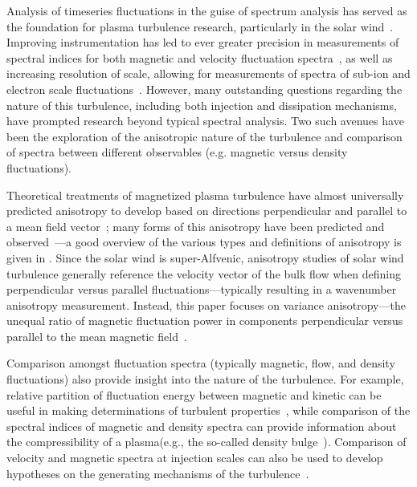 \documentclass[manuscript]{aastex}
\begin{document}
Analysis of timeseries fluctuations in the guise of spectrum analysis has served as the foundation for plasma turbulence research, particularly in the solar wind~\citep{gol95,tum95}. Improving instrumentation has led to ever greater precision in measurements of spectral indices for both magnetic and velocity fluctuation spectra~\citep{pod07}, as well as increasing resolution of scale, allowing for measurements of spectra of sub-ion and electron scale fluctuations~\citep{yor08,ale09,sah09,che13}. However, many outstanding questions regarding the nature of this turbulence, including both injection and dissipation mechanisms, have prompted research beyond typical spectral analysis. Two such avenues have been the exploration of the anisotropic nature of the turbulence and comparison of spectra between different observables (e.g. magnetic versus density fluctuations).

Theoretical treatments of magnetized plasma turbulence have almost universally predicted anisotropy to develop based on directions perpendicular and parallel to a mean field vector~\citep{mon81,mat90,sri95,zho04,bol06}; many forms of this anisotropy have been predicted and observed~\citep{das05,hor08,pod09,per09,wic10,he11}---a good overview of the various types and definitions of anisotropy is given in \citet{hor12}. Since the solar wind is super-Alfvenic, anisotropy studies of solar wind turbulence generally reference the velocity vector of the bulk flow when defining perpendicular versus parallel fluctuations---typically resulting in a wavenumber anisotropy measurement. Instead, this paper focuses on variance anisotropy---the unequal ratio of magnetic fluctuation power in components perpendicular versus parallel to the mean magnetic field~\citep{bel71,smi06}.

Comparison amongst fluctuation spectra (typically magnetic, flow, and density fluctuations) also provide insight into the nature of the turbulence. For example, relative partition of fluctuation energy between magnetic and kinetic can be useful in making determinations of turbulent properties~\citep{pod07}, while comparison of the spectral indices of magnetic and density spectra can provide information about the compressibility of a plasma(e.g., the so-called density bulge~\citep{col89,har05}). Comparison of velocity and magnetic spectra at injection scales can also be used to develop hypotheses on the generating mechanisms of the turbulence~\citep{rob10}.
\end{document}
